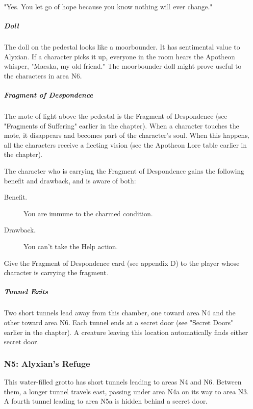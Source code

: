 \documentclass[10pt,a4paper,twoside,bg=print,twocolumn,openany,nodeprecatedcode]{dndbook}
\begin{document}
\begin{DndReadAloud}{}
"Yes. You let go of hope because you know nothing will ever change."

\end{DndReadAloud}

\subparagraph{Doll}
The doll on the pedestal looks like a moorbounder. It has sentimental value to Alyxian. If a character picks it up, everyone in the room hears the Apotheon whisper, "Maeska, my old friend." The moorbounder doll might prove useful to the characters in area N6.

\subparagraph{Fragment of Despondence}
The mote of light above the pedestal is the Fragment of Despondence (see "Fragments of Suffering" earlier in the chapter). When a character touches the mote, it disappears and becomes part of the character's soul. When this happens, all the characters receive a fleeting vision (see the Apotheon Lore table earlier in the chapter).

The character who is carrying the Fragment of Despondence gains the following benefit and drawback, and is aware of both:

\begin{DndSidebar}[float=!b]{}

\begin{description}
\item[Benefit.]
You are immune to the charmed condition.
\item[Drawback.]
You can't take the Help action.
\end{description}



\end{DndSidebar}

Give the Fragment of Despondence card (see appendix D) to the player whose character is carrying the fragment.

\subparagraph{Tunnel Exits}
Two short tunnels lead away from this chamber, one toward area N4 and the other toward area N6. Each tunnel ends at a secret door (see "Secret Doors" earlier in the chapter). A creature leaving this location automatically finds either secret door.

\subsubsection{N5: Alyxian's Refuge}
This water-filled grotto has short tunnels leading to areas N4 and N6. Between them, a longer tunnel travels east, passing under area N4a on its way to area N3. A fourth tunnel leading to area N5a is hidden behind a secret door.
\end{document}
